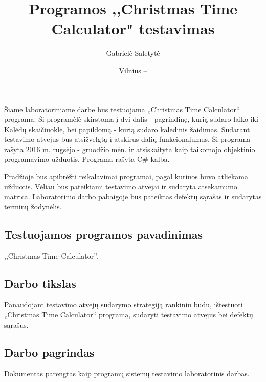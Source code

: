 \documentclass{VUMIFPSkursinis}
\title{Programos ,,Christmas Time Calculator" testavimas}
\author{Gabrielė Saletytė}
\date{Vilnius – \the\year}
\begin{document}
    \newenvironment{innerParagraph}[1][0.5cm]{\begin{adjustwidth}{#1}{}}{\end{adjustwidth}}
        
    \maketitle
    \tableofcontents
	
	 \label{anotacija}
		Šiame laboratoriniame darbe bus testuojama „Christmas Time Calculator“ programa.
		Ši programėlė skirstoma į dvi dalis - pagrindinę, kurią sudaro laiko iki Kalėdų skaičiuoklė, bei papildomą - 
		kurią sudaro kalėdinis žaidimas.
		Sudarant testavimo atvejus bus atsižvelgtą į atskirus dalių funkcionalumus.
		Ši programa rašyta 2016 m. rugsėjo - gruodžio mėn. ir atsiskaityta kaip taikomojo objektinio programavimo užduotis.
		Programa rašyta C\# kalba.

		Pradžioje bus apibrėžti reikalavimai programai, pagal kuriuos buvo atliekama užduotis.
		Vėliau bus pateikiami testavimo atvejai ir sudaryta atsekamumo matrica.
		Laboratorinio darbo pabaigoje bus pateiktas defektų sąrašas ir sudarytas terminų žodynėlis.
	 \label{ivadas}
		\subsection*{Testuojamos programos pavadinimas} \label{ivadas_psPavadinimas}
			,,Christmas Time Calculator''.
		\subsection*{Darbo tikslas} \label{ivadas_darboTikslas}
			Panaudojant testavimo atvejų sudarymo strategiją rankiniu būdu, 
			ištestuoti „Christmas Time Calculator“ programą, sudaryti testavimo atvejus bei defektų sąrašus.
		\subsection*{Darbo pagrindas} \label{ivadas_pagrindas}
			Dokumentas parengtas kaip programų sistemų testavimo laboratorinis darbas.
	
\end{document}
